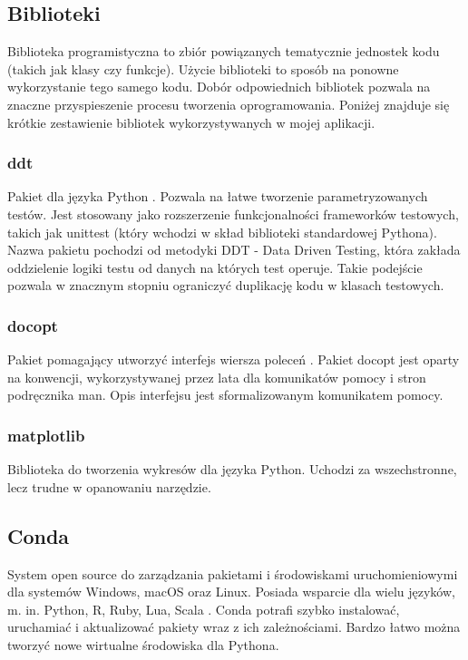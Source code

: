 \subsection{Biblioteki}
Biblioteka programistyczna to zbiór powiązanych tematycznie jednostek kodu (takich jak klasy czy funkcje). Użycie biblioteki to sposób na ponowne wykorzystanie tego samego kodu. Dobór odpowiednich bibliotek pozwala na znaczne przyspieszenie procesu tworzenia oprogramowania. Poniżej znajduje się krótkie zestawienie bibliotek wykorzystywanych w mojej aplikacji.

\subsubsection{ddt}
\label{DdtOpis}
Pakiet dla języka Python \cite{ddt:documentation}. Pozwala na łatwe tworzenie parametryzowanych testów. Jest stosowany jako rozszerzenie funkcjonalności frameworków testowych, takich jak unittest (który wchodzi w skład biblioteki standardowej Pythona). Nazwa pakietu pochodzi od metodyki DDT - Data Driven Testing, która zakłada oddzielenie logiki testu od danych na których test operuje. Takie podejście pozwala w znacznym stopniu ograniczyć duplikację kodu w klasach testowych.
\subsubsection{docopt}
\label{docoptOpis}
Pakiet pomagający utworzyć interfejs wiersza poleceń \cite{docopt:documentation}. Pakiet docopt jest oparty na konwencji, wykorzystywanej przez lata dla komunikatów pomocy i stron podręcznika man. Opis interfejsu jest sformalizowanym komunikatem pomocy.
\subsubsection{matplotlib}
\label{matplotlibDescription}
Biblioteka do tworzenia wykresów dla języka Python. Uchodzi za wszechstronne, lecz trudne w opanowaniu narzędzie.
\subsection{Conda}
System open source do zarządzania pakietami i środowiskami uruchomieniowymi dla systemów Windows, macOS oraz Linux. Posiada wsparcie dla wielu języków, m. in. Python, R, Ruby, Lua, Scala \cite{conda:documentation}.
Conda potrafi szybko instalować, uruchamiać i aktualizować pakiety wraz z ich zależnościami.
Bardzo łatwo można tworzyć nowe wirtualne środowiska dla Pythona.

